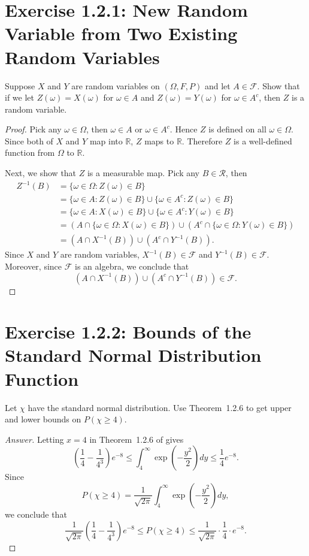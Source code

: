 \documentclass{amsbook}
\theoremstyle{definition}
\theoremstyle{remark}
\numberwithin{section}{chapter}
\numberwithin{equation}{chapter}
\begin{document}
\section{Exercise 1.2.1: New Random Variable from Two Existing Random Variables}
Suppose $X$ and $Y$ are random variables on $(\Omega,F,P)$ and let $A\in\mathcal{F}$. Show that if we let $Z(\omega)=X(\omega)$ for $\omega\in A$ and $Z(\omega)=Y(\omega)$ for $\omega\in A^c$, then $Z$ is a random variable.
\begin{proof}
Pick any $\omega\in\Omega$, then $\omega\in A$ or $\omega\in A^c$. Hence $Z$ is defined on all $\omega\in\Omega$. Since both of $X$ and $Y$ map into $\mathbb{R}$, $Z$ maps to $\mathbb{R}$. Therefore $Z$ is a well-defined function from $\Omega$ to $\mathbb{R}$.

Next, we show that $Z$ is a measurable map. Pick any $B\in\mathcal{R}$, then\[
\begin{split}
Z^{-1}(B)&=\{\omega\in\Omega:Z(\omega)\in B\}\\
&=\{\omega\in A:Z(\omega)\in B\}\cup\{\omega\in A^c:Z(\omega)\in B\}\\
&=\{\omega\in A:X(\omega)\in B\}\cup\{\omega\in A^c:Y(\omega)\in B\}\\
&=(A\cap\{\omega\in\Omega:X(\omega)\in B\})\cup(A^c\cap\{\omega\in\Omega:Y(\omega)\in B\})\\
&=(A\cap X^{-1}(B))\cup(A^c\cap Y^{-1}(B)).
\end{split}
\]Since $X$ and $Y$ are random variables, $X^{-1}(B)\in\mathcal{F}$ and $Y^{-1}(B)\in\mathcal{F}$. Moreover, since $\mathcal{F}$ is an algebra, we conclude that\[
(A\cap X^{-1}(B))\cup(A^c\cap Y^{-1}(B))\in\mathcal{F}.
\]
\end{proof}

\section{Exercise 1.2.2: Bounds of the Standard Normal Distribution Function}
Let $\chi$ have the standard normal distribution. Use Theorem~1.2.6 to get upper and lower bounds on $P(\chi\geqslant4)$.
\begin{proof}[Answer]
Letting $x=4$ in Theorem~1.2.6 of \cite{durrett2019probability} gives\[
(\frac{1}{4}-\frac{1}{4^3})e^{-8}\leqslant\int_4^\infty\exp(-\frac{y^2}{2})dy\leqslant\frac{1}{4}e^{-8}.
\]Since\[
P(\chi\geqslant4)=\frac{1}{\sqrt{2\pi}}\int_4^\infty\exp(-\frac{y^2}{2})dy,
\]we conclude that\[
\frac{1}{\sqrt{2\pi}}(\frac{1}{4}-\frac{1}{4^3})e^{-8}\leqslant P(\chi\geqslant4)\leqslant\frac{1}{\sqrt{2\pi}}\cdot\frac{1}{4}\cdot e^{-8}.
\]
\end{proof}
\end{document}
